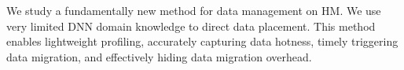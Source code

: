 We study a fundamentally new method for data management on HM. %
We use very limited DNN domain knowledge to direct data placement. This method enables lightweight profiling, accurately capturing data hotness, timely triggering data migration, and effectively hiding data migration overhead. 


















\begin{comment}
For instance, multi-GPU systems have been explored
when the batch and model parameters do not fit in the memory of a single GPU. The solution has been to reduce the batch size and make it fit in memory. But this changes the batch size and alters the convergence
\end{comment}